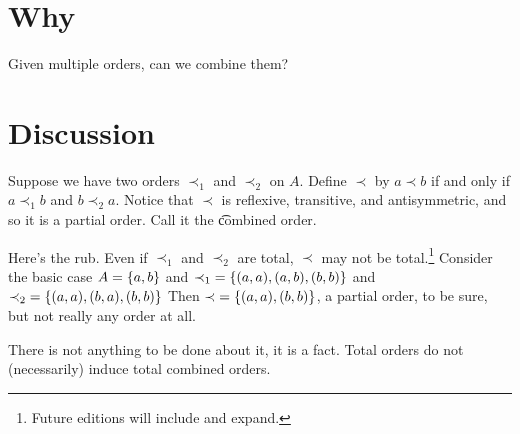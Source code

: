 
\section*{Why}

Given multiple orders, can we combine them?

\section*{Discussion}

Suppose we have two orders $\prec_1$ and $\prec_2$ on $A$.
Define $\prec$ by $a \prec b$ if and only if $a \prec_1 b$ and $b \prec_2 a$.
Notice that $\prec$ is reflexive, transitive, and antisymmetric, and so it is a partial order.
Call it the \t{combined order}.

Here's the rub.
Even if $\prec_1$ and $\prec_2$ are total, $\prec$ may not be total.\footnote{Future editions will include and expand.}
Consider the basic case $A = \{a, b\}$ and $\prec_1 \; = \{(a,a), (a, b), (b,b)\}$ and $\prec_2 \; = \{(a,a), (b,a), (b,b)\}$
Then $\prec \; = \{(a,a), (b,b)\}$, a partial order, to be sure, but not really any order at all.

There is not anything to be done about it, it is a fact.
Total orders do not (necessarily) induce total combined orders.

\blankpage